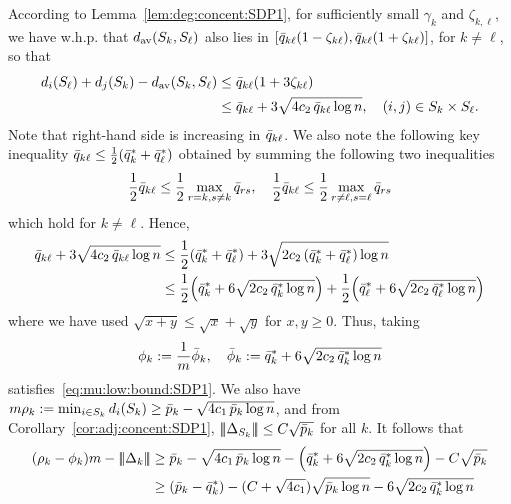   According to Lemma~\ref{lem:deg:concent:SDP1}, for sufficiently small $\gamma_k$ and $\zeta_{k,\ell}$, we have w.h.p. that
  $d_{\text{av}}(S_{k},S_{\ell})$  also lies in $[\bar{q}_{k \ell}(1-\zeta_{k\ell}),\bar{q}_{k \ell} (1+\zeta_{k \ell})]$, for $k \neq \ell$, so that 
  \begin{align*}
    d_{i}(S_{\ell})  + d_{j}(S_{k}) - d_{\text{av}}(S_{k},S_{\ell}) &\le \bar{q}_{k \ell}(1+3\zeta_{k \ell}) \\
     &\le \bar{q}_{k \ell} + 3 \sqrt{4c_2 \, \bar{q}_{k \ell} \log n}, \quad (i,j) \in S_{k}\times S_{\ell}.
  \end{align*}
  Note that right-hand side is increasing in $\bar{q}_{k \ell}$. We also note the following key inequality
    $\bar{q}_{k \ell} \le \frac12 (\bar{q}^*_k + \bar{q}^*_\ell)$
  obtained by summing the following two inequalities
  \begin{align*}
    \frac12 \bar{q}_{k \ell} \le \frac12 \max_{r = k, s \neq k} \bar{q}_{r s}, \quad 
     \frac12 \bar{q}_{k \ell}  \le \frac12 \max_{r \neq  \ell, s = \ell} \bar{q}_{r s}
  \end{align*}
  which hold for $k \neq \ell$. Hence,
  \begin{align*}
    \bar{q}_{k \ell} + 3 \sqrt{4c_2 \, \bar{q}_{k \ell} \log n} 
      &\le \frac12(\bar{q}^*_k + \bar{q}^*_\ell) + 3 \sqrt{2c_2 \, (\bar{q}^*_k+\bar{q}^*_\ell) \log n} \\
      &\le \frac12\Big(\bar{q}^*_k + 6\sqrt{2c_2 \, \bar{q}^*_k \log n}\Big) +
       \frac12 \Big(\bar{q}^*_\ell + 6 \sqrt{2c_2 \, \bar{q}^*_\ell \log n}\Big) 
  \end{align*}
  where we have used $\sqrt{x+y} \le \sqrt{x} + \sqrt{y}$ for $x,y \ge 0$. Thus, taking
  \begin{align*}
    \phi_k := \frac1m \bar{\phi}_k, \quad \bar{\phi}_k:= \bar{q}^*_k + 6\sqrt{2c_2 \, \bar{q}^*_k \log n}
  \end{align*}
  satisfies~\eqref{eq:mu:low:bound:SDP1}. We also have 
  $
    m \rho_k := \min_{i \in S_{k}} d_{i}(S_{k}) \ge \bar{p}_k - \sqrt{4c_1\, \bar{p}_k \log n}
  $,
  and from Corollary~\ref{cor:adj:concent:SDP1}, $|\!|\!|\Delta_{S_{k}}|\!|\!| \le C \sqrt{\bar{p}_k}$ for all $k$. It follows that
  \begin{align*}
    (\rho_k - \phi_k) m - |\!|\!|\Delta_k|\!|\!|
      &\ge \bar{p}_k - \sqrt{4c_1\, \bar{p}_k \log n}
        - \Big(\bar{q}^*_k + 6\sqrt{2c_2 \, \bar{q}^*_k \log n}\Big) - C \sqrt{\bar{p}_k} \\
      &\ge (\bar{p}_k 
        - \bar{q}^*_k) - (C + \sqrt{4c_1}) \sqrt{\bar{p}_k \log n} - 6\sqrt{2c_2 \, \bar{q}^*_k \log n} 
  \end{align*}
